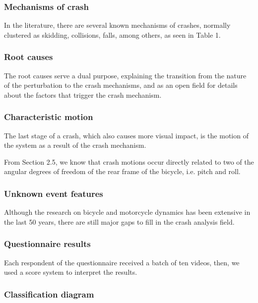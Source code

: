 \documentclass{article}
\begin{document}
\subsubsection{Mechanisms of crash}

In the literature, there are several known mechanisms of crashes, normally clustered as skidding, collisions, falls, among others, as seen in Table 1.

\subsubsection{Root causes}

The root causes serve a dual purpose, explaining the transition from the nature of the perturbation to the crash mechanisms, and as an open field for details about the factors that trigger the crash mechanism.

\subsubsection{Characteristic motion}

The last stage of a crash, which also causes more visual impact, is the motion of the system as a result of the crash mechanism.

From Section 2.5, we know that crash motions occur directly related to two of the angular degrees of freedom
of the rear frame of the bicycle, i.e. pitch and roll. 

\subsubsection{Unknown event features}

Although the research on bicycle and motorcycle dynamics has been extensive in the last 50 years, there are still major gaps to fill in the crash analysis field.

\subsubsection{Questionnaire results}

Each respondent of the questionnaire received a batch of ten videos, then, we used a score system to interpret the results.

\subsubsection{Classification diagram}
\end{document}
